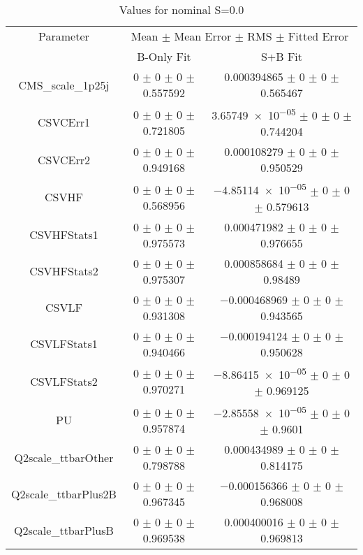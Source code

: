\begin{table}
\centering
\caption{Values for nominal S=0.0}
\begin{tabular}{ccc}
\toprule
Parameter & \multicolumn{2}{c}{Mean $\pm$ Mean Error $\pm$ RMS $\pm$ Fitted Error}\\
 & B-Only Fit & S+B Fit\\
\midrule
CMS\_scale\_1p25j & \num{0} $\pm$ \num{0} $\pm$ \num{0} $\pm$ \num{0.557592} & \num{0.000394865} $\pm$ \num{0} $\pm$ \num{0} $\pm$ \num{0.565467}\\
CSVCErr1 & \num{0} $\pm$ \num{0} $\pm$ \num{0} $\pm$ \num{0.721805} & \num{3.65749e-05} $\pm$ \num{0} $\pm$ \num{0} $\pm$ \num{0.744204}\\
CSVCErr2 & \num{0} $\pm$ \num{0} $\pm$ \num{0} $\pm$ \num{0.949168} & \num{0.000108279} $\pm$ \num{0} $\pm$ \num{0} $\pm$ \num{0.950529}\\
CSVHF & \num{0} $\pm$ \num{0} $\pm$ \num{0} $\pm$ \num{0.568956} & \num{-4.85114e-05} $\pm$ \num{0} $\pm$ \num{0} $\pm$ \num{0.579613}\\
CSVHFStats1 & \num{0} $\pm$ \num{0} $\pm$ \num{0} $\pm$ \num{0.975573} & \num{0.000471982} $\pm$ \num{0} $\pm$ \num{0} $\pm$ \num{0.976655}\\
CSVHFStats2 & \num{0} $\pm$ \num{0} $\pm$ \num{0} $\pm$ \num{0.975307} & \num{0.000858684} $\pm$ \num{0} $\pm$ \num{0} $\pm$ \num{0.98489}\\
CSVLF & \num{0} $\pm$ \num{0} $\pm$ \num{0} $\pm$ \num{0.931308} & \num{-0.000468969} $\pm$ \num{0} $\pm$ \num{0} $\pm$ \num{0.943565}\\
CSVLFStats1 & \num{0} $\pm$ \num{0} $\pm$ \num{0} $\pm$ \num{0.940466} & \num{-0.000194124} $\pm$ \num{0} $\pm$ \num{0} $\pm$ \num{0.950628}\\
CSVLFStats2 & \num{0} $\pm$ \num{0} $\pm$ \num{0} $\pm$ \num{0.970271} & \num{-8.86415e-05} $\pm$ \num{0} $\pm$ \num{0} $\pm$ \num{0.969125}\\
PU & \num{0} $\pm$ \num{0} $\pm$ \num{0} $\pm$ \num{0.957874} & \num{-2.85558e-05} $\pm$ \num{0} $\pm$ \num{0} $\pm$ \num{0.9601}\\
Q2scale\_ttbarOther & \num{0} $\pm$ \num{0} $\pm$ \num{0} $\pm$ \num{0.798788} & \num{0.000434989} $\pm$ \num{0} $\pm$ \num{0} $\pm$ \num{0.814175}\\
Q2scale\_ttbarPlus2B & \num{0} $\pm$ \num{0} $\pm$ \num{0} $\pm$ \num{0.967345} & \num{-0.000156366} $\pm$ \num{0} $\pm$ \num{0} $\pm$ \num{0.968008}\\
Q2scale\_ttbarPlusB & \num{0} $\pm$ \num{0} $\pm$ \num{0} $\pm$ \num{0.969538} & \num{0.000400016} $\pm$ \num{0} $\pm$ \num{0} $\pm$ \num{0.969813}\\

\end{tabular}
\end{table}
